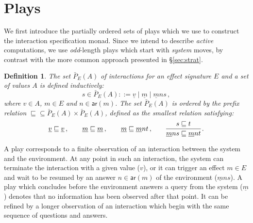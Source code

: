 \documentclass[draft,11pt]{report}
\newtheorem{definition}{Definition}
\newcommand{\kw}[1]{\ensuremath{ \mathsf{#1} }}
\begin{document}

\section{Plays} \label{sec:intm:plays} %

We first introduce the partially ordered sets of plays
which we use to construct the interaction specification monad.
Since we intend to describe \emph{active} computations,
we use \emph{odd}-length plays which start with \emph{system} moves,
by contrast with the more common approach
presented in \S\ref{sec:strat}.

\begin{definition}
The set $\bar{P}_E(A)$ of \emph{interactions}
for an effect signature $E$ and a set of values $A$
is defined inductively:
\[
  s \in \bar{P}_E(A) ::=
    \underline{v} \mid
    \underline{m} \mid
    \underline{m} n s \,,
\]
where $v \in A$, $m \in E$ and $n \in \kw{ar}(m)$.
The set $\bar{P}_E(A)$ is ordered by the prefix relation
${\sqsubseteq} \subseteq \bar{P}_E(A) \times \bar{P}_E(A)$,
defined
as the smallest relation satisfying:
\[
  \underline{v} \sqsubseteq \underline{v} \,, \qquad
  \underline{m} \sqsubseteq \underline{m} \,, \qquad
  \underline{m} \sqsubseteq \underline{m} n t \,, \qquad
  \begin{prooftree}
    \hypo{s \sqsubseteq t}
    \infer1{\underline{m} n s \sqsubseteq \underline{m} n t}
  \end{prooftree} \,.
\]
\end{definition}

A play corresponds to a finite observation of
an interaction between the system and the environment.
At any point in such an interaction,
the system can terminate the interaction with a given value ($v$),
or it can trigger an effect $m \in E$ and
wait to be resumed by
an answer $n \in \kw{ar}(m)$ of the environment
($\underline{m} n s$).
%
A play which concludes before
the environment answers a query from the system ($\underline{m}$)
denotes that no information has been observed after that point.
It can be refined by a longer observation
of an interaction which begin with the same sequence of
questions and answers.

%
%

\end{document}
